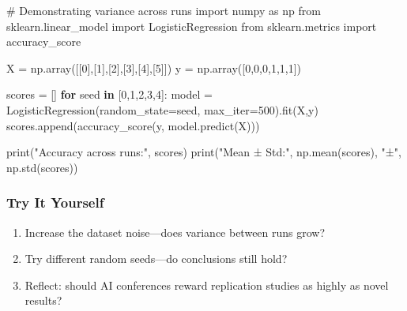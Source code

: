 \documentclass[
  letterpaper,
  DIV=11,
  numbers=noendperiod]{scrreprt}
\newenvironment{Shaded}{\begin{snugshade}}{\end{snugshade}}
\newcommand{\BuiltInTok}[1]{\textcolor[rgb]{0.00,0.23,0.31}{#1}}
\newcommand{\CommentTok}[1]{\textcolor[rgb]{0.37,0.37,0.37}{#1}}
\newcommand{\ControlFlowTok}[1]{\textcolor[rgb]{0.00,0.23,0.31}{\textbf{#1}}}
\newcommand{\DecValTok}[1]{\textcolor[rgb]{0.68,0.00,0.00}{#1}}
\newcommand{\ImportTok}[1]{\textcolor[rgb]{0.00,0.46,0.62}{#1}}
\newcommand{\KeywordTok}[1]{\textcolor[rgb]{0.00,0.23,0.31}{\textbf{#1}}}
\newcommand{\NormalTok}[1]{\textcolor[rgb]{0.00,0.23,0.31}{#1}}
\newcommand{\OperatorTok}[1]{\textcolor[rgb]{0.37,0.37,0.37}{#1}}
\newcommand{\StringTok}[1]{\textcolor[rgb]{0.13,0.47,0.30}{#1}}
\providecommand{\tightlist}{%
  \setlength{\itemsep}{0pt}\setlength{\parskip}{0pt}}
\begin{document}
\begin{Shaded}
\begin{Highlighting}[]
\CommentTok{\# Demonstrating variance across runs}
\ImportTok{import}\NormalTok{ numpy }\ImportTok{as}\NormalTok{ np}
\ImportTok{from}\NormalTok{ sklearn.linear\_model }\ImportTok{import}\NormalTok{ LogisticRegression}
\ImportTok{from}\NormalTok{ sklearn.metrics }\ImportTok{import}\NormalTok{ accuracy\_score}

\NormalTok{X }\OperatorTok{=}\NormalTok{ np.array([[}\DecValTok{0}\NormalTok{],[}\DecValTok{1}\NormalTok{],[}\DecValTok{2}\NormalTok{],[}\DecValTok{3}\NormalTok{],[}\DecValTok{4}\NormalTok{],[}\DecValTok{5}\NormalTok{]])}
\NormalTok{y }\OperatorTok{=}\NormalTok{ np.array([}\DecValTok{0}\NormalTok{,}\DecValTok{0}\NormalTok{,}\DecValTok{0}\NormalTok{,}\DecValTok{1}\NormalTok{,}\DecValTok{1}\NormalTok{,}\DecValTok{1}\NormalTok{])}

\NormalTok{scores }\OperatorTok{=}\NormalTok{ []}
\ControlFlowTok{for}\NormalTok{ seed }\KeywordTok{in}\NormalTok{ [}\DecValTok{0}\NormalTok{,}\DecValTok{1}\NormalTok{,}\DecValTok{2}\NormalTok{,}\DecValTok{3}\NormalTok{,}\DecValTok{4}\NormalTok{]:}
\NormalTok{    model }\OperatorTok{=}\NormalTok{ LogisticRegression(random\_state}\OperatorTok{=}\NormalTok{seed, max\_iter}\OperatorTok{=}\DecValTok{500}\NormalTok{).fit(X,y)}
\NormalTok{    scores.append(accuracy\_score(y, model.predict(X)))}

\BuiltInTok{print}\NormalTok{(}\StringTok{"Accuracy across runs:"}\NormalTok{, scores)}
\BuiltInTok{print}\NormalTok{(}\StringTok{"Mean ± Std:"}\NormalTok{, np.mean(scores), }\StringTok{"±"}\NormalTok{, np.std(scores))}
\end{Highlighting}
\end{Shaded}

\subsubsection{Try It Yourself}\label{try-it-yourself-94}

\begin{enumerate}
\def\labelenumi{\arabic{enumi}.}
\tightlist
\item
  Increase the dataset noise---does variance between runs grow?
\item
  Try different random seeds---do conclusions still hold?
\item
  Reflect: should AI conferences reward replication studies as highly as
  novel results?
\end{enumerate}
\end{document}
